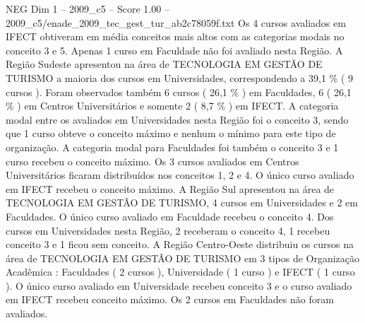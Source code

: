\begin{textsample}{NEG Dim 1 – 2009\_c5 – Score 1.00 – 2009\_c5/enade\_2009\_tec\_gest\_tur\_ab2c78059f.txt}
Os 4 cursos avaliados em IFECT obtiveram em média conceitos mais altos com as categorias modais no conceito 3 e 5.
Apenas 1 curso em Faculdade não foi avaliado nesta Região.
A Região Sudeste apresentou na área de TECNOLOGIA EM GESTÃO DE TURISMO a maioria dos cursos em Universidades, correspondendo a 39,1 \% ( 9 cursos ).
Foram observados também 6 cursos ( 26,1 \% ) em Faculdades, 6 ( 26,1 \% ) em Centros Universitários e somente 2 ( 8,7 \% ) em IFECT.
A categoria modal entre os avaliados em Universidades nesta Região foi o conceito 3, sendo que 1 curso obteve o conceito máximo e nenhum o mínimo para este tipo de organização.
A categoria modal para Faculdades foi também o conceito 3 e 1 curso recebeu o conceito máximo.
Os 3 cursos avaliados em Centros Universitários ficaram distribuídos nos conceitos 1, 2 e 4.
O único curso avaliado em IFECT recebeu o conceito máximo.
A Região Sul apresentou na área de TECNOLOGIA EM GESTÃO DE TURISMO, 4 cursos em Universidades e 2 em Faculdades.
O único curso avaliado em Faculdade recebeu o conceito 4.
Dos cursos em Universidades nesta Região, 2 receberam o conceito 4, 1 recebeu conceito 3 e 1 ficou sem conceito.
A Região Centro-Oeste distribuiu os cursos na área de TECNOLOGIA EM GESTÃO DE TURISMO em 3 tipos de Organização Acadêmica : Faculdades ( 2 cursos ), Universidade ( 1 curso ) e IFECT ( 1 curso ).
O único curso avaliado em Universidade recebeu conceito 3 e o curso avaliado em IFECT recebeu conceito máximo.
Os 2 cursos em Faculdades não foram avaliados.

\end{textsample}
